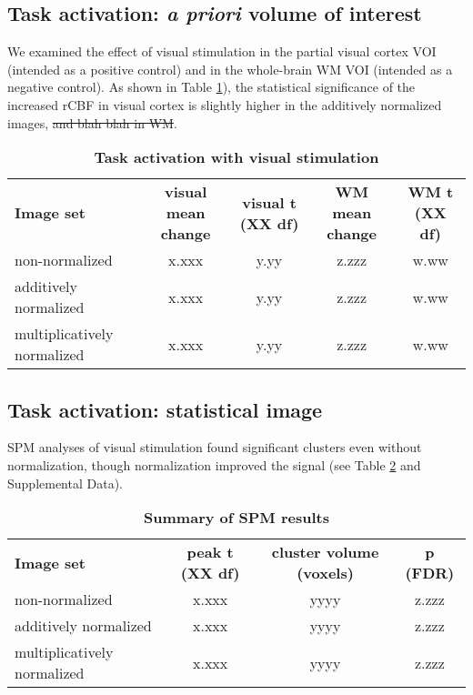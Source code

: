 \subsection{Task activation: \textit{a priori} volume of interest}
We examined the effect of visual stimulation in the partial visual cortex VOI (intended as a positive control) and in the whole-brain WM VOI (intended as a negative control). As shown in Table \ref{table:taskVOI}), the statistical significance of the increased rCBF in visual cortex is slightly higher in the additively normalized images, \sout{and blah blah in WM}.

\begin{table}
\begin{tabular}{lcccc}
  \textbf{Image set} & \textbf{visual mean change} & \textbf{visual t (XX df)} &        \textbf{WM mean change} & \textbf{WM t (XX df)} \\
  non-normalized & x.xxx & y.yy & z.zzz & w.ww \\
  additively normalized & x.xxx & y.yy & z.zzz & w.ww \\
  multiplicatively normalized & x.xxx & y.yy & z.zzz & w.ww \\
\end{tabular}
\caption{\textbf{Task activation with visual stimulation}}
\label{table:taskVOI}
\end{table}

\subsection{Task activation: statistical image}
SPM analyses of visual stimulation found significant clusters even without normalization, though normalization improved the signal (see Table \ref{table:SPMresults} and Supplemental Data).

\begin{table}
\begin{tabular}{lccc}
  \textbf{Image set} & \textbf{peak t (XX df)} & \textbf{cluster volume (voxels)} & \textbf{p (FDR)} \\
  non-normalized & x.xxx & yyyy & z.zzz \\
  additively normalized & x.xxx & yyyy & z.zzz \\
  multiplicatively normalized & x.xxx & yyyy & z.zzz \\
\end{tabular}
\caption{\textbf{Summary of SPM results}}
\label{table:SPMresults}
\end{table}
